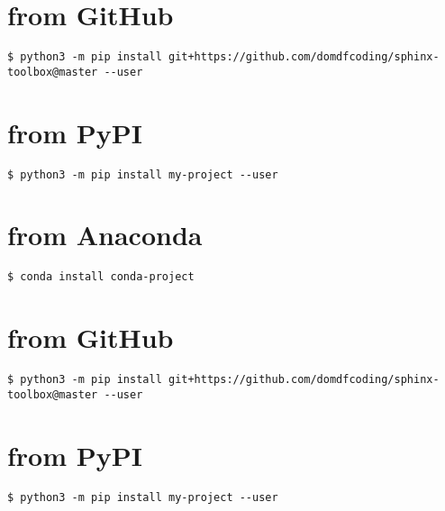 \documentclass[letterpaper,10pt,english]{sphinxmanual}
\begin{document}
\chapter{from GitHub}
\label{\detokenize{installation:installation-15-from_GitHub}}
\begin{Verbatim}[commandchars=\\\{\}]
$ python3 -m pip install git+https://github.com/domdfcoding/sphinx-toolbox@master --user
\end{Verbatim}


\chapter{from PyPI}
\label{\detokenize{installation:installation-16-from_PyPI}}\label{\detokenize{installation:installation-16}}
\begin{Verbatim}[commandchars=\\\{\}]
$ python3 -m pip install my-project --user
\end{Verbatim}


\chapter{from Anaconda}
\label{\detokenize{installation:installation-16-from_Anaconda}}
\begin{Verbatim}[commandchars=\\\{\}]
$ conda install conda-project
\end{Verbatim}


\chapter{from GitHub}
\label{\detokenize{installation:installation-16-from_GitHub}}
\begin{Verbatim}[commandchars=\\\{\}]
$ python3 -m pip install git+https://github.com/domdfcoding/sphinx-toolbox@master --user
\end{Verbatim}


\chapter{from PyPI}
\label{\detokenize{installation:installation-17-from_PyPI}}\label{\detokenize{installation:installation-17}}
\begin{Verbatim}[commandchars=\\\{\}]
$ python3 -m pip install my-project --user
\end{Verbatim}
\end{document}
